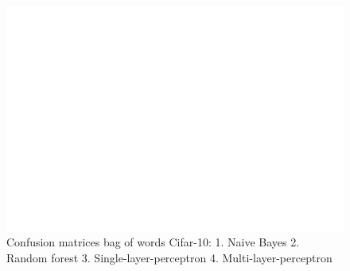 \documentclass[11pt]{article}
\begin{document}
\begin{figure}[H]
\begin{minipage}[c]{0.5\textwidth}
\end{minipage}
\begin{minipage}[c]{0.5\textwidth}
\includegraphics[width=1\linewidth]{figures/Cifar/CM__MLP_BOW.pdf}
\end{minipage}
\caption{Confusion matrices bag of words Cifar-10: 1. Naive Bayes 2. Random forest 3. Single-layer-perceptron 4. Multi-layer-perceptron}
\label{CV_Matrices_Cifar_BOW}
\end{figure}
\end{document}
